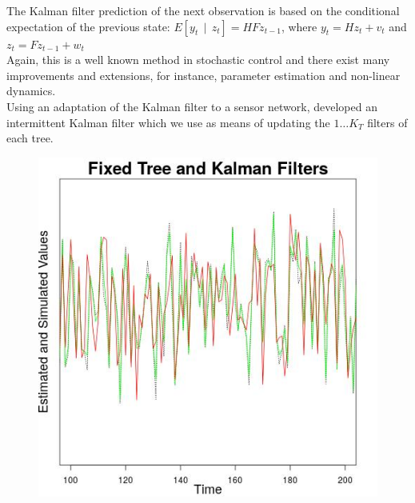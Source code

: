 \documentclass[a1paper,portrait, fontscale=0.45]{baposter}
\DeclareMathOperator{\giv}{\, | \,}
\begin{document}
\begin{poster}
{\small{The Kalman filter prediction of the next observation is based on the conditional expectation of the previous state: $E[y_t \giv z_t] = HFz_{t-1}$, where $y_t = Hz_t + v_t$ and $z_t = Fz_{t-1} + w_t$}\\

\small{Again, this is a well known method in stochastic control and there exist many improvements and extensions, for instance, parameter estimation and non-linear dynamics.\\
Using an adaptation of the Kalman filter to a sensor network, \cite{sinopoli} developed an intermittent Kalman filter which we use as means of updating the $1 \dots K_T$ filters of each tree.} 
\begin{figure}[H]
\hspace{1em}
\begin{minipage}[c]{0.4\linewidth}
\includegraphics[width=\linewidth]{fixkf.jpeg}
\label{fig:fixtree1}
\end{minipage}
\hspace{1.5em}
\begin{minipage}[c]{0.4\linewidth}

\end{minipage}
\end{figure}}
\end{poster}
\end{document}
